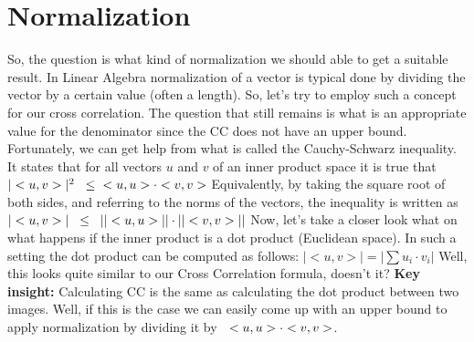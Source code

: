 \documentclass{article}
\begin{document}
\section{Normalization}
So, the question is what kind of normalization we should able to get a suitable result. In Linear Algebra normalization of a vector is typical done by dividing the vector by a certain value (often a length). So, let's try to employ such a concept for our cross correlation. The question that still remains is what is an appropriate value for the denominator since the CC does not have an upper bound.
\newline \newline
Fortunately, we can get help from what is called the Cauchy-Schwarz inequality. It states that for all vectors $u$ and $v$ of an inner product space it is true that
\newline \newline
$|<u,v>|^2 \hspace{0.2cm} \leq \hspace{0.2cm}<u,u> \cdot <v,v>$
\newline \newline
Equivalently, by taking the square root of both sides, and referring to the norms of the vectors, the inequality is written as
\newline \newline
$|<u,v>| \hspace{0.2cm} \leq \hspace{0.2cm} ||<u,u>|| \cdot ||<v,v>||$
\newline \newline
Now, let's take a closer look what on what happens if the inner product is a dot product (Euclidean space). In such a setting the dot product can be computed as follows:
\newline \newline
$|<u,v>| = |\sum u_i \cdot v_i|$
\newline \newline
Well, this looks quite similar to our Cross Correlation formula, doesn't it? 
\newline \newline
\textbf{Key insight:} Calculating CC is the same as calculating the dot product between two images.
\newline\newline
Well, if this is the case we can easily come up with an upper bound to apply normalization by dividing it by $\hspace{0.2cm}<u,u> \cdot <v,v>$.
\end{document}
